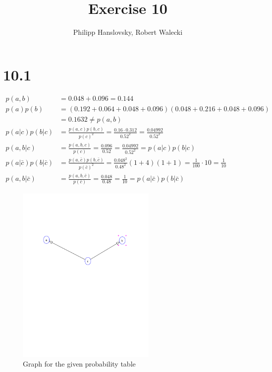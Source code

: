\documentclass[a4paper,11pt]{article}
\title{Exercise 10}
\author{Philipp Hanslovsky, Robert Walecki}
\theoremstyle{definition}
\theoremstyle{plain}
\theoremstyle{remark}
\begin{document}


\maketitle

\section*{10.1}
\begin{align}
p(a, b) &= 0.048 + 0.096 = 0.144 \\
p(a)p(b) &= (0.192 + 0.064 + 0.048 + 0.096)(0.048 + 0.216 + 0.048 + 0.096) \\
&= 0.1632 \ne p(a, b) \\
p(a|c)p(b|c) &= \frac{p(a,c)p(b,c)}{p(c)^2} = \frac{0.16\cdot0.312}{0.52^2} = \frac{0.04992}{0.52^2} \\
p(a,b|c) &= \frac{p(a,b,c)}{p(c)} =\frac{0.096}{0.52} = \frac{0.04992}{0.52^2} = p(a|c)p(b|c) \\
p(a|\bar{c})p(b|\bar{c}) &= \frac{p(a,\bar{c})p(b,\bar{c})}{p(\bar{c})^2} = \frac{0.048^2}{0.48^2}(1+4)(1+1) = \frac{1}{100}\cdot10 = \frac{1}{10} \\
p(a,b|\bar{c}) &= \frac{p(a,b,\bar{c})}{p(\bar{c})} =\frac{0.048}{0.48} = \frac{1}{10} = p(a|\bar{c})p(b|\bar{c})
\end{align}

\begin{figure}[H]
\centering
\includegraphics[width=0.6\textwidth]{out.pdf}
\caption{Graph for the given probability table}
\label{fig:graph}
\end{figure}
\end{document}
